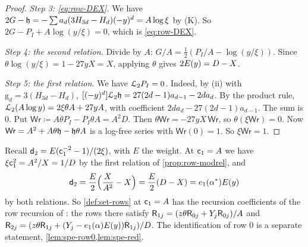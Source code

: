 \begin{proof}
\emph{Step 3: \eqref{eq:row-DEX}.} We have $2G-\mathfrak{h}=-\sum a_d(3H_{3d}-H_d)(-y)^d=A\log\xi$ by (K). So $2G-P_I+A\log(y/\xi)=0$, which is \eqref{eq:row-DEX}.

\emph{Step 4: the second relation.} Divide by $A$: $G/A=\frac12(P_I/A-\log(y/\xi))$. Since $\theta\log(y/\xi)=1-27yX=X$, applying $\theta$ gives $2E(y)=D-X$.

\emph{Step 5: the first relation.} We have $\mathcal{L}_{2} P_I=0$. Indeed, by (ii) with $\mathrm{g}_d=3(H_{3d}-H_d)$, $[(-y)^d]\mathcal{L}_{2}\mathfrak{h}=27(2d-1)a_{d-1}-2da_d$. By the product rule, $\mathcal{L}_{2}(A\log y)=2\xi\theta A+27yA$, with coefficient $2da_d-27(2d-1)a_{d-1}$. The sum is $0$. Put $\mathsf{Wr}\coloneqq A\theta P_I-P_I\theta A=A^2D$. Then $\theta\mathsf{Wr}=-27yX\,\mathsf{Wr}$, so $\theta(\xi\mathsf{Wr})=0$. Now $\mathsf{Wr}=A^2+A\theta\mathfrak{h}-\mathfrak{h}\theta A$ is a log-free series with $\mathsf{Wr}(0)=1$. So $\xi\mathsf{Wr}=1$.
\end{proof}

\begin{rmk}[Dictionary at $\cone=A$]
\label{rmk:row-dict}
Recall $\mathsf{d}_{2}=E(\mathsf{c}_{1}^{-2}-1)/(2\xi)$, with $E$ the weight. At $\cone=A$ we have $\xi\mathsf{c}_{1}^2=A^2/X=1/D$ by the first relation of \cref{prop:row-modrel}, and
\[
\mathsf{d}_{2}=\frac E2\Big(\frac{X}{A^2}-X\Big)=\frac E2(D-X)=e_1(\alpha^*)E(y)
\]
by both relations. So \cref{def:set-rows} at $\cone=A$ has the recursion coefficients of the row recursion of \cite{BS}: the rows there satisfy $\mathsf{R}_{1j}=(z\theta\mathsf{R}_{0j}+Y_j\mathsf{R}_{0j})/A$ and $\mathsf{R}_{2j}=(z\theta\mathsf{R}_{1j}+(Y_j-e_1(\alpha)E(y))\mathsf{R}_{1j})/D$. The identification of row $0$ is a separate statement, \cref{lem:spe-row0,lem:spe-red}. 
\end{rmk}
